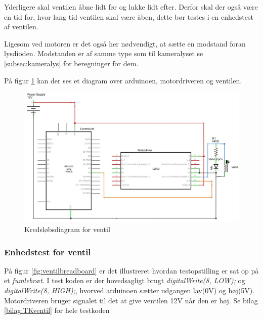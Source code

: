 Yderligere skal ventilen åbne lidt før og lukke lidt efter. Derfor skal der også være en tid for, hvor lang tid ventilen skal være åben, dette bør testes i en enhedstest af ventilen.

Ligesom ved motoren er det også her nødvendigt, at sætte en modstand foran lysdioden. Modstanden er af samme type som til kameralyset se \ref{subsec:kameralys} for beregninger for dem. 

\newpage
 På figur \ref{fig:ventildiagram} kan der ses et diagram over arduinoen, motordriveren og ventilen.

\begin{figure}[H]
	\centering
	\includegraphics[width=1\textwidth]{billeder/Hardware/diagrammer/ventildiagram.JPG}
	\caption{Kredsløbsdiagram for ventil}
	\label{fig:ventildiagram}
\end{figure} 
\newpage
\subsubsection{Enhedstest for ventil}
På figur \ref{fig:ventilbreadboard} er det illustreret hvordan testopstilling er sat op på et \textit{fumlebræt}. I test koden er der hovedsagligt brugt \textit{digitalWrite(8, LOW);} og \textit{digitalWrite(8, HIGH);}, hvorved arduinoen sætter udgangen lav(0V) og høj(5V). Motordriveren bruger signalet til det at give ventilen 12V når den er høj. Se bilag \ref{bilag:TKventil} for hele testkoden

